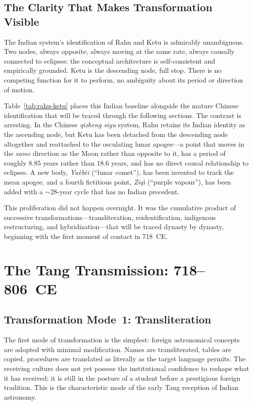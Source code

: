 \documentclass[10pt,a4paper]{article}
\begin{document}
\subsection*{The Clarity That Makes Transformation Visible}

The Indian system's identification of Rahu and Ketu is admirably
unambiguous. Two nodes, always opposite, always moving at the same rate,
always causally connected to eclipses: the conceptual architecture is
self-consistent and empirically grounded.  Ketu is the descending node,
full stop.  There is no competing function for it to perform, no
ambiguity about its period or direction of motion.

Table~\ref{tab:rahu-ketu} places this Indian baseline alongside the
mature Chinese identification that will be traced through the following
sections.  The contrast is arresting.  In the Chinese \textit{qizheng siyu}
system, Rahu retains its Indian identity as the ascending
node, but Ketu has been detached from the descending node
altogether and reattached to the osculating lunar apogee---a point that
moves in the \emph{same} direction as the Moon rather than opposite to
it, has a period of roughly 8.85 years rather than 18.6 years, and has
no direct causal relationship to eclipses.  A new body, \textit{Yu\`eb\`ei}
(``lunar comet''), has been invented to track the
mean apogee, and a fourth fictitious point, \textit{Ziq\`{\i}}
(``purple vapour''), has been added with a $\sim$28-year cycle that has
no Indian precedent.

This proliferation did not happen overnight.  It was the cumulative
product of successive transformations---transliteration, reidentification,
indigenous restructuring, and hybridization---that will be traced
dynasty by dynasty, beginning with the first moment of contact in
718~CE.

\section{The Tang Transmission: 718--806~CE}\label{sec:tang}

\subsection*{Transformation Mode~1: Transliteration}

The first mode of transformation is the simplest: foreign astronomical
concepts are adopted with minimal modification.  Names are transliterated,
tables are copied, procedures are translated as literally as the target
language permits.  The receiving culture does not yet possess the
institutional confidence to reshape what it has received; it is still
in the posture of a student before a prestigious foreign tradition.
This is the characteristic mode of the early Tang reception of Indian
astronomy.
\end{document}

